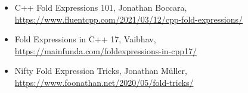 \begin{itemize}
\item
C++ Fold Expressions 101, Jonathan Boccara, \url{https://www.fluentcpp.com/2021/03/12/cpp-fold-expressions/}

\item
Fold Expressions in C++ 17, Vaibhav, \url{https://mainfunda.com/foldexpressions-in-cpp17/}

\item
Nifty Fold Expression Tricks, Jonathan Müller, \url{https://www.foonathan.net/2020/05/fold-tricks/}
\end{itemize}